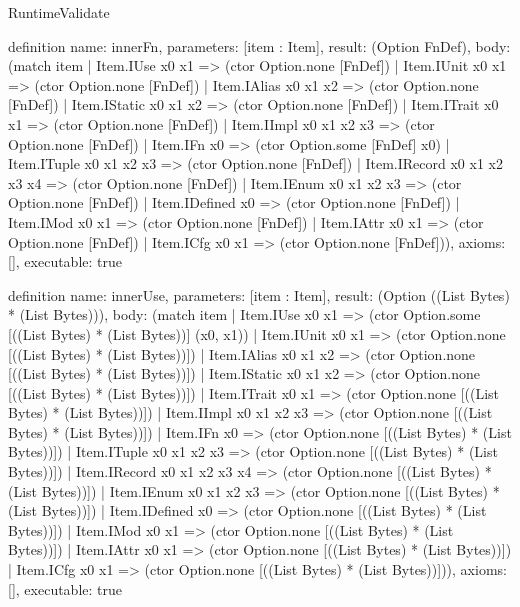 \begin{lexlean}{RuntimeValidate}
\begin{semanticmodule}
definition{
  name: innerFn,
  parameters: [item : Item],
  result: (Option FnDef),
  body: (match item
    | Item.IUse x0 x1 => (ctor Option.none [FnDef])
    | Item.IUnit x0 x1 => (ctor Option.none [FnDef])
    | Item.IAlias x0 x1 x2 => (ctor Option.none [FnDef])
    | Item.IStatic x0 x1 x2 => (ctor Option.none [FnDef])
    | Item.ITrait x0 x1 => (ctor Option.none [FnDef])
    | Item.IImpl x0 x1 x2 x3 => (ctor Option.none [FnDef])
    | Item.IFn x0 => (ctor Option.some [FnDef] x0)
    | Item.ITuple x0 x1 x2 x3 => (ctor Option.none [FnDef])
    | Item.IRecord x0 x1 x2 x3 x4 => (ctor Option.none [FnDef])
    | Item.IEnum x0 x1 x2 x3 => (ctor Option.none [FnDef])
    | Item.IDefined x0 => (ctor Option.none [FnDef])
    | Item.IMod x0 x1 => (ctor Option.none [FnDef])
    | Item.IAttr x0 x1 => (ctor Option.none [FnDef])
    | Item.ICfg x0 x1 => (ctor Option.none [FnDef])),
  axioms: [],
  executable: true
}

definition{
  name: innerUse,
  parameters: [item : Item],
  result: (Option ((List Bytes) * (List Bytes))),
  body: (match item
    | Item.IUse x0 x1 => (ctor Option.some [((List Bytes) * (List Bytes))] (x0, x1))
    | Item.IUnit x0 x1 => (ctor Option.none [((List Bytes) * (List Bytes))])
    | Item.IAlias x0 x1 x2 => (ctor Option.none [((List Bytes) * (List Bytes))])
    | Item.IStatic x0 x1 x2 => (ctor Option.none [((List Bytes) * (List Bytes))])
    | Item.ITrait x0 x1 => (ctor Option.none [((List Bytes) * (List Bytes))])
    | Item.IImpl x0 x1 x2 x3 => (ctor Option.none [((List Bytes) * (List Bytes))])
    | Item.IFn x0 => (ctor Option.none [((List Bytes) * (List Bytes))])
    | Item.ITuple x0 x1 x2 x3 => (ctor Option.none [((List Bytes) * (List Bytes))])
    | Item.IRecord x0 x1 x2 x3 x4 => (ctor Option.none [((List Bytes) * (List Bytes))])
    | Item.IEnum x0 x1 x2 x3 => (ctor Option.none [((List Bytes) * (List Bytes))])
    | Item.IDefined x0 => (ctor Option.none [((List Bytes) * (List Bytes))])
    | Item.IMod x0 x1 => (ctor Option.none [((List Bytes) * (List Bytes))])
    | Item.IAttr x0 x1 => (ctor Option.none [((List Bytes) * (List Bytes))])
    | Item.ICfg x0 x1 => (ctor Option.none [((List Bytes) * (List Bytes))])),
  axioms: [],
  executable: true
}


\end{semanticmodule}
\end{lexlean}
